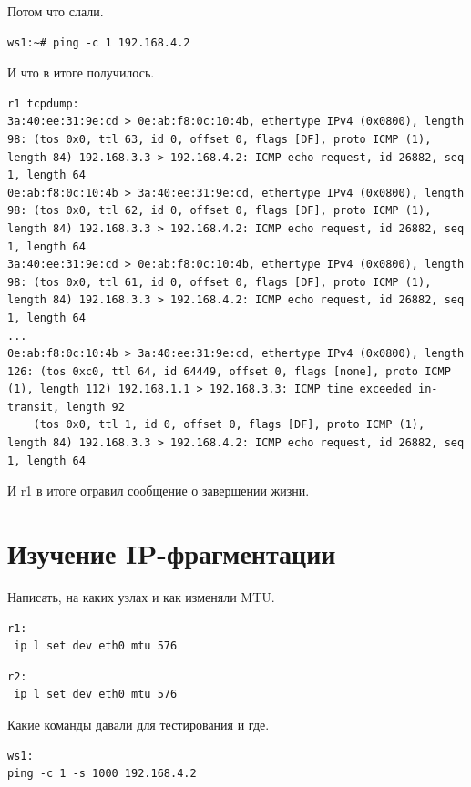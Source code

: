 \documentclass[a4paper,12pt]{article}
\begin{document}
Потом что слали.

\begin{Verbatim}
ws1:~# ping -c 1 192.168.4.2
\end{Verbatim}

И что в итоге получилось.

\begin{Verbatim}
r1 tcpdump:
3a:40:ee:31:9e:cd > 0e:ab:f8:0c:10:4b, ethertype IPv4 (0x0800), length 98: (tos 0x0, ttl 63, id 0, offset 0, flags [DF], proto ICMP (1), length 84) 192.168.3.3 > 192.168.4.2: ICMP echo request, id 26882, seq 1, length 64
0e:ab:f8:0c:10:4b > 3a:40:ee:31:9e:cd, ethertype IPv4 (0x0800), length 98: (tos 0x0, ttl 62, id 0, offset 0, flags [DF], proto ICMP (1), length 84) 192.168.3.3 > 192.168.4.2: ICMP echo request, id 26882, seq 1, length 64
3a:40:ee:31:9e:cd > 0e:ab:f8:0c:10:4b, ethertype IPv4 (0x0800), length 98: (tos 0x0, ttl 61, id 0, offset 0, flags [DF], proto ICMP (1), length 84) 192.168.3.3 > 192.168.4.2: ICMP echo request, id 26882, seq 1, length 64
...
0e:ab:f8:0c:10:4b > 3a:40:ee:31:9e:cd, ethertype IPv4 (0x0800), length 126: (tos 0xc0, ttl 64, id 64449, offset 0, flags [none], proto ICMP (1), length 112) 192.168.1.1 > 192.168.3.3: ICMP time exceeded in-transit, length 92
	(tos 0x0, ttl 1, id 0, offset 0, flags [DF], proto ICMP (1), length 84) 192.168.3.3 > 192.168.4.2: ICMP echo request, id 26882, seq 1, length 64
\end{Verbatim}

И r1 в итоге отравил сообщение о завершении жизни.

\section{Изучение IP-фрагментации}

Написать, на каких узлах и как изменяли MTU.


\begin{Verbatim}
r1:
 ip l set dev eth0 mtu 576
\end{Verbatim}

\begin{Verbatim}
r2:
 ip l set dev eth0 mtu 576
\end{Verbatim}


Какие команды давали для тестирования и где.

\begin{Verbatim}
ws1:
ping -c 1 -s 1000 192.168.4.2
\end{Verbatim}
\end{document}
